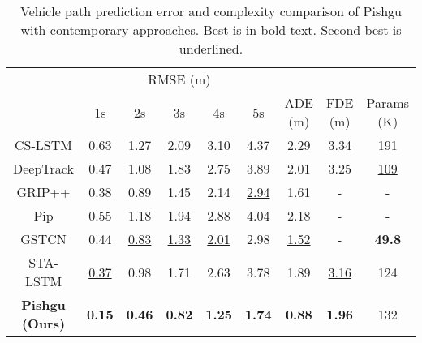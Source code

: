 \documentclass[sigconf]{acmart}
\begin{document}
\begin{table*}[!b]
\renewcommand{\arraystretch}{1.3}
\centering
\caption{Vehicle path prediction error and complexity comparison of Pishgu with contemporary approaches. Best is in bold text. Second best is
underlined.}
\label{tab:ngsim_results}\vspace{-10pt}
  \begin{adjustbox}{max width = \linewidth,center}
    \begin{tabular}{c||c|c|c|c|c||c|c||c}
    \rowcolor{DarkGray} {} & \multicolumn{5}{c||}{RMSE (m)}        &  &  &  \\  \cline{2-9} \rowcolor{Gray}
          & 1s    & 2s    & 3s    & 4s    & 5s    &   {ADE (m)}    &   {FDE (m)}    & \multicolumn{1}{c}{Params (K)}  \\ \hline \hline
    
    CS-LSTM \cite{CSlstm18} & 0.63  & 1.27  & 2.09  & 3.10   & 4.37 & 2.29  & 3.34   & \multicolumn{1}{c}{191} \\ \hline
    DeepTrack \cite{katariya2021deeptrack} & 0.47  & 1.08  & 1.83  & 2.75  & 3.89  & 2.01  & 3.25  & \multicolumn{1}{c}{\underline{109}}  \\ \hline
    
    GRIP++ \cite{2020gripplus} &  0.38  &   0.89 &    {1.45}   & 2.14       &    \underline{2.94}   &    1.61       &    -   & \multicolumn{1}{c}{-}  \\ \hline
Pip \cite{Pip2021}  & 0.55  & 1.18  & 1.94  & 2.88  & 4.04  &   2.18    &    -   & \multicolumn{1}{c}{-}   \\ \hline
GSTCN \cite{GSTCN2022}& 0.44  & \underline{0.83}  & \underline{1.33}   & \underline{2.01}  & 2.98  &   \underline{1.52 }   &   -    & \multicolumn{1}{c}{\textbf{49.8}}   \\ \hline
STA-LSTM \cite{STALSTM2021} & \underline{0.37}  & 0.98  & 1.71  & 2.63  & 3.78  & 1.89  & \underline{3.16}  & \multicolumn{1}{c}{124} \\ \hline
\rowcolor{LightGray} \textbf{Pishgu (Ours)} & \textbf{0.15}  & \textbf{0.46}  & \textbf{0.82}  & \textbf{1.25}  & \textbf{1.74}  & \textbf{0.88}  & \textbf{1.96}  & \multicolumn{1}{c}{132}  \\
    \end{tabular}\end{adjustbox}
\vspace{-10pt}
\end{table*}
\end{document}
